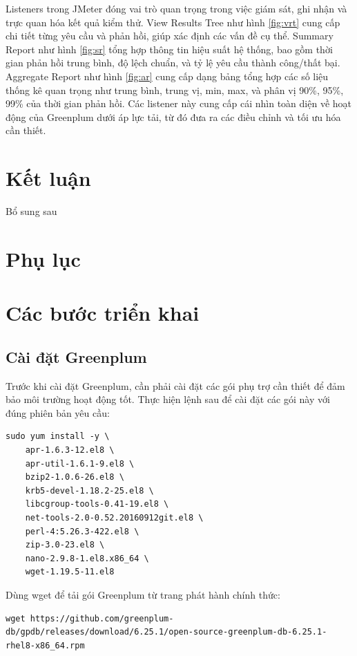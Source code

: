 \documentclass[14pt]{article}
\begin{document}
Listeners trong JMeter đóng vai trò quan trọng trong việc giám sát, ghi nhận và trực quan hóa kết quả kiểm thử. View Results Tree như hình \ref{fig:vrt} cung cấp chi tiết từng yêu cầu và phản hồi, giúp xác định các vấn đề cụ thể. Summary Report như hình \ref{fig:sr} tổng hợp thông tin hiệu suất hệ thống, bao gồm thời gian phản hồi trung bình, độ lệch chuẩn, và tỷ lệ yêu cầu thành công/thất bại. Aggregate Report như hình \ref{fig:ar} cung cấp dạng bảng tổng hợp các số liệu thống kê quan trọng như trung bình, trung vị, min, max, và phân vị 90\%, 95\%, 99\% của thời gian phản hồi. Các listener này cung cấp cái nhìn toàn diện về hoạt động của Greenplum dưới áp lực tải, từ đó đưa ra các điều chỉnh và tối ưu hóa cần thiết.


\section{Kết luận}
Bổ sung sau

\section{Phụ lục}
\appendix

\section{Các bước triển khai}




\subsection{Cài đặt Greenplum}

Trước khi cài đặt Greenplum, cần phải cài đặt các gói phụ trợ cần thiết để đảm bảo môi trường hoạt động tốt. Thực hiện lệnh sau để cài đặt các gói này với đúng phiên bản yêu cầu:
\begin{verbatim}
sudo yum install -y \
    apr-1.6.3-12.el8 \
    apr-util-1.6.1-9.el8 \
    bzip2-1.0.6-26.el8 \
    krb5-devel-1.18.2-25.el8 \
    libcgroup-tools-0.41-19.el8 \
    net-tools-2.0-0.52.20160912git.el8 \
    perl-4:5.26.3-422.el8 \
    zip-3.0-23.el8 \
    nano-2.9.8-1.el8.x86_64 \
    wget-1.19.5-11.el8
\end{verbatim}

Dùng wget để tải gói Greenplum từ trang phát hành chính thức:

\begin{verbatim}
wget https://github.com/greenplum-db/gpdb/releases/download/6.25.1/open-source-greenplum-db-6.25.1-rhel8-x86_64.rpm
\end{verbatim}
\end{document}
